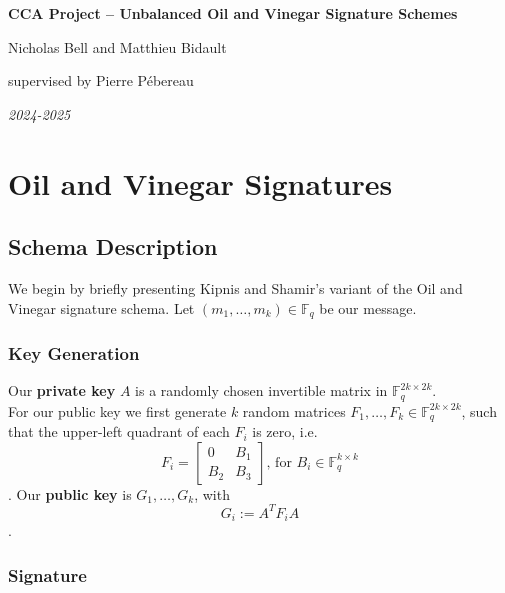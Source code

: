 \documentclass[12pt, a4paper]{article}
\begin{document}
	
	
	\begin{titlepage}
		\centering
		{\Huge\textbf{CCA Project -- Unbalanced Oil and Vinegar Signature Schemes}\par}
		\vspace{0.5cm}
		{\Large Nicholas Bell and Matthieu Bidault\par}
		\vspace{0.5cm}
		{\Large supervised by Pierre Pébereau\par}
		\vfill
		\textit{2024-2025}
		\vspace*{\fill}
	\end{titlepage}
	
	\setcounter{tocdepth}{3}
	\tableofcontents
	\thispagestyle{fancy}
	\newpage
	
	\section{Oil and Vinegar Signatures}
	
	\subsection{Schema Description}
	
	We begin by briefly presenting Kipnis and Shamir's variant of the Oil and Vinegar signature schema. Let $(m_1,\dots,m_k) \in \mathbb{F}_q$ be our message.
	
	\subsubsection{Key Generation}
	
	Our \textbf{private key} $A$ is a randomly chosen invertible matrix in $\mathbb{F}_q^{2k\times2k}$.\\
	
	For our public key we first generate $k$ random matrices $F_1,\dots,F_k \in \mathbb{F}_q^{2k\times2k}$, such that the upper-left quadrant of each $F_i$ is zero, i.e. $$F_i = \begin{bmatrix}
	0 & B_1\\
	B_2 & B_3
	\end{bmatrix}\text{, for }B_i \in \mathbb{F}_q^{k\times k}$$. Our \textbf{public key} is $G_1,\dots,G_k$, with $$G_i := A^TF_iA$$.
	
	\subsubsection{Signature}
	
\end{document}
